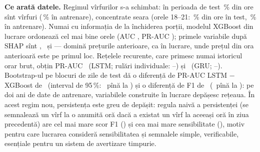%
{\textbf{Ce arată datele.} Regimul vîrfurilor s-a schimbat: în perioada de test \NspikeTest\,\% din ore sînt vîrfuri (\NspikeTrain\,\% în antrenare), concentrate seara (orele 18--21: \NeveTest\,\% din ore în test, \NeveTrain\,\% în antrenare).
Numai cu informația de la închiderea porții, modelul XGBoost din lucrare ordonează cel mai bine orele (AUC \NxAUC, PR-AUC \NxPR); primele variabile după SHAP sînt \Ntop, \Nsecond\ și \Nthird{} --- domină prețurile anterioare, ca în lucrare, unde prețul din ora anterioară este pe primul loc.
Rețelele recurente, care primesc numai istoricul orar brut, obțin PR-AUC \NlPR\ (LSTM; rulări individuale: \NlPRmin--\NlPRmax) și \NgPR\ (GRU; \NgPRmin--\NgPRmax).
Bootstrap-ul pe blocuri de zile de test dă o diferență de PR-AUC LSTM $-$ XGBoost de \NdPR\ (interval de 95\,\%: \NdPRlo\ pînă la \NdPRhi) și o diferență de F1 de \NdFone\ (\NdFlo\ pînă la \NdFhi): pe doi ani de date de antrenare, variabilele construite în lucrare depășesc rețeaua.
În acest regim nou, persistența este greu de depășit: regula naivă a persistenței (se semnalează un vîrf la o anumită oră dacă a existat un vîrf la aceeași oră în ziua precedentă) are cel mai mare scor F1 (\NnFone) și cea mai mare sensibilitate (\NnRec), motiv pentru care lucrarea consideră sensibilitatea și semnalele simple, verificabile, esențiale pentru un sistem de avertizare timpurie.}

